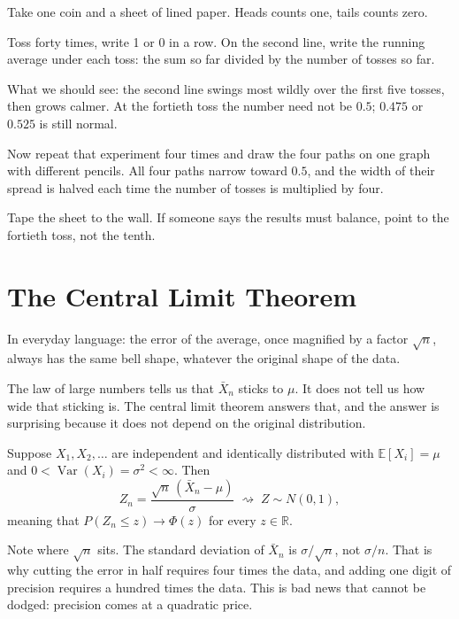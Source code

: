 \begin{tangan}
Take one coin and a sheet of lined paper. Heads counts one, tails counts zero.

Toss forty times, write 1 or 0 in a row. On the second line, write the running
average under each toss: the sum so far divided by the number of tosses so far.

What we should see: the second line swings most wildly over the first five tosses,
then grows calmer. At the fortieth toss the number need not be $0.5$; $0.475$ or
$0.525$ is still normal.

Now repeat that experiment four times and draw the four paths on one graph with
different pencils. All four paths narrow toward $0.5$, and the width of their
spread is halved each time the number of tosses is multiplied by four.

Tape the sheet to the wall. If someone says the results must balance, point to the
fortieth toss, not the tenth.
\end{tangan}

\section{The Central Limit Theorem}

In everyday language: the error of the average, once magnified by a factor
$\sqrt n$, always has the same bell shape, whatever the original shape of the data.

The law of large numbers tells us that $\bar X_n$ sticks to $\mu$. It does not tell
us how wide that sticking is. The central limit theorem answers that, and the answer
is surprising because it does not depend on the original distribution.


\begin{teorema}
Suppose $X_1,X_2,\dots$ are independent and identically distributed with
$\mathbb{E}[X_i]=\mu$ and $0<\operatorname{Var}(X_i)=\sigma^2<\infty$. Then
\[
Z_n=\frac{\sqrt n\,(\bar X_n-\mu)}{\sigma}
\;\rightsquigarrow\; Z\sim N(0,1),
\]
meaning that $P(Z_n\le z)\to\Phi(z)$ for every $z\in\mathbb{R}$.
\end{teorema}

Note where $\sqrt n$ sits. The standard deviation of $\bar X_n$ is $\sigma/\sqrt n$,
not $\sigma/n$. That is why cutting the error in half requires four times the data,
and adding one digit of precision requires a hundred times the data. This is bad
news that cannot be dodged: precision comes at a quadratic price.

